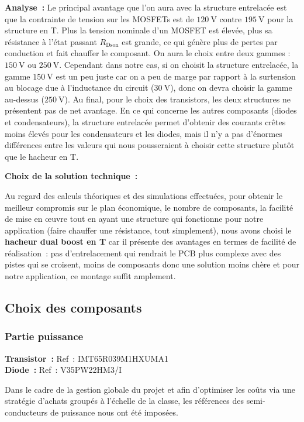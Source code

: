 \textbf{Analyse~:} Le principal avantage que l'on aura avec la structure entrelacée est que la contrainte de tension sur les MOSFETs est de $120~\text{V}$ contre $195~\text{V}$ pour la structure en T. Plus la tension nominale d'un MOSFET est élevée, plus sa résistance à l'état passant $R_{\text{Dson}}$ est grande, ce qui génère plus de pertes par conduction et fait chauffer le composant. On aura le choix entre deux gammes : $150~\text{V}$ ou $250~\text{V}$. Cependant dans notre cas, si on choisit la structure entrelacée, la gamme $150~\text{V}$ est un peu juste car on a peu de marge par rapport à la surtension au blocage due à l'inductance du circuit ($30~\text{V}$), donc on devra choisir la gamme au-dessus ($250~\text{V}$). Au final, pour le choix des transistors, les deux structures ne présentent pas de net avantage. En ce qui concerne les autres composants (diodes et condensateurs), la structure entrelacée permet d'obtenir des courants crêtes moins élevés pour les condensateurs et les diodes, mais il n'y a pas d'énormes différences entre les valeurs qui nous pousseraient à choisir cette structure plutôt que le hacheur en T.

\textbf{Choix de la solution technique~:}

Au regard des calculs théoriques et des simulations effectuées, pour obtenir le meilleur compromis sur le plan économique, le nombre de composants, la facilité de mise en œuvre tout en ayant une structure qui fonctionne pour notre application (faire chauffer une résistance, tout simplement), nous avons choisi le \textbf{hacheur dual boost en T} car il présente des avantages en termes de facilité de réalisation~: pas d'entrelacement qui rendrait le PCB plus complexe avec des pistes qui se croisent, moins de composants donc une solution moins chère et pour notre application, ce montage suffit amplement.

        \subsection{Choix des composants}

\subsubsection*{Partie puissance}

\textbf{Transistor~:} Ref~: IMT65R039M1HXUMA1 \\
\textbf{Diode~:} Ref~: V35PW22HM3/I

Dans le cadre de la gestion globale du projet et afin d'optimiser les coûts via une stratégie d'achats groupés à l'échelle de la classe, les références des semi-conducteurs de puissance nous ont été imposées.

